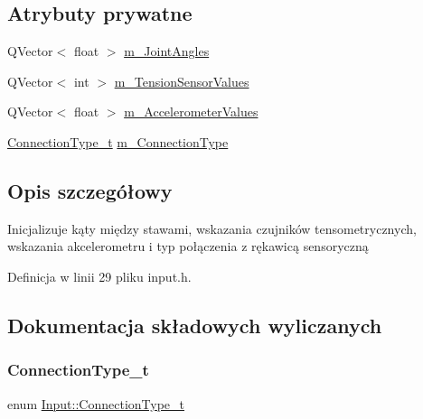 \subsection*{Atrybuty prywatne}
\begin{DoxyCompactItemize}
\item 
Q\+Vector$<$ float $>$ \hyperlink{class_input_a5d17336e82b13b4a5416ea0bf197c5ba}{m\+\_\+\+Joint\+Angles}
\item 
Q\+Vector$<$ int $>$ \hyperlink{class_input_a1ce9ef99c48ee1e7adee67ecadd161c6}{m\+\_\+\+Tension\+Sensor\+Values}
\item 
Q\+Vector$<$ float $>$ \hyperlink{class_input_ab2572d4f32d4a82f4023277b24a4b0a4}{m\+\_\+\+Accelerometer\+Values}
\item 
\hyperlink{class_input_a3be20be9b454515798ecd3370f4e36fd}{Connection\+Type\+\_\+t} \hyperlink{class_input_aeccfe44263c5985405f94c5feb0ed0aa}{m\+\_\+\+Connection\+Type}
\end{DoxyCompactItemize}


\subsection{Opis szczegółowy}
Inicjalizuje kąty między stawami, wskazania czujników tensometrycznych, wskazania akcelerometru i typ połączenia z rękawicą sensoryczną 

Definicja w linii 29 pliku input.\+h.



\subsection{Dokumentacja składowych wyliczanych}
\mbox{\label{class_input_a3be20be9b454515798ecd3370f4e36fd}} 
\subsubsection{\texorpdfstring{Connection\+Type\+\_\+t}{ConnectionType\_t}}
{\footnotesize\ttfamily enum \hyperlink{class_input_a3be20be9b454515798ecd3370f4e36fd}{Input\+::\+Connection\+Type\+\_\+t}\hspace{0.3cm}{\ttfamily [private]}}

